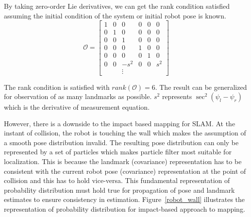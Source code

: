 By taking zero-order Lie derivatives, we can get the rank condition satisfied assuming the initial condition of the system or initial robot pose is known.
\begin{equation}
\mathcal{O}=\begin{bmatrix}
1 & 0 & 0 & 0 & 0 & 0 \\
0 & 1 & 0 & 0 & 0 & 0 \\
0 & 0 & 1 & 0 & 0 & 0 \\
0 & 0 & 0 & 1 & 0 & 0 \\
0 & 0 & 0 & 0 & 1 & 0 \\
0 & 0 & -s^2 & 0 & 0 & s^2 \\
& & \vdots & &  &
\end{bmatrix}
\end{equation}

The rank condition is satisfied with $rank(\mathcal{O})=6$. The result can be generalized for observation of as many landmarks as possible. $s^2$ represents $\sec^2(\psi_l-\psi_r)$ which is the derivative of measurement equation.

However, there is a downside to the impact based mapping for SLAM. At the instant of collision, the robot is touching the wall which makes the assumption of a smooth pose distribution invalid. The resulting pose distribution can only be represented by a set of particles which makes particle filter most suitable for localization. This is because the landmark (covariance) representation has to be consistent with the current robot pose (covariance) representation at the point of collision and this has to hold vice-versa. This fundamental representation of probability distribution must hold true for propagation of pose and landmark estimates to ensure consistency in estimation. Figure~\ref{robot_wall} illustrates the representation of probability distribution for impact-based approach to mapping.

